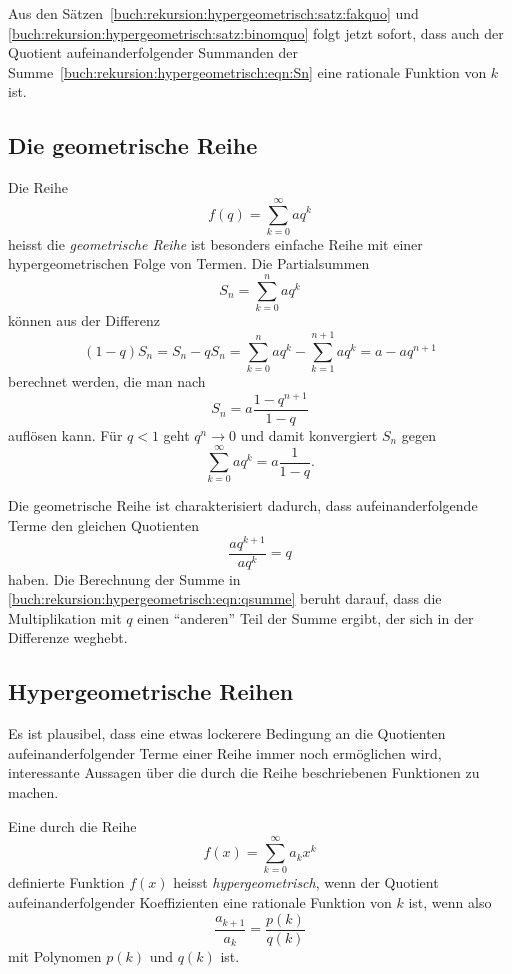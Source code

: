 Aus den Sätzen~\ref{buch:rekursion:hypergeometrisch:satz:fakquo}
und
\ref{buch:rekursion:hypergeometrisch:satz:binomquo}
folgt jetzt sofort, dass auch der Quotient aufeinanderfolgender
Summanden der Summe~\eqref{buch:rekursion:hypergeometrisch:eqn:Sn}
eine rationale Funktion von $k$ ist.

%
%
\subsection{Die geometrische Reihe
\label{buch:rekursion:hypergeometrisch:geometrisch}}
Die Reihe
\[
f(q)
=
\sum_{k=0}^\infty aq^k
\]
heisst die {\em geometrische Reihe} ist besonders einfache
Reihe mit einer hypergeometrischen Folge von Termen.
%
%
Die Partialsummen 
\[
S_n
=
\sum_{k=0}^n aq^k
\]
können aus der Differenz
\begin{equation}
(1-q)S_n
=
S_n - qS_n
=
\sum_{k=0}^n aq^k
-
\sum_{k=1}^{n+1} aq^k
=
a -aq^{n+1}
\label{buch:rekursion:hypergeometrisch:eqn:qsumme}
\end{equation}
berechnet werden, die man nach
\begin{equation}
S_n 
=
a\frac{1-q^{n+1}}{1-q}
\label{buch:rekursion:hypergeometrisch:eqn:geomsumme}
\end{equation}
auflösen kann.
Für $q<1$ geht $q^n\to 0$ und damit konvergiert
$S_n$  gegen
\[
\sum_{k=0}^\infty aq^k
=
a\frac{1}{1-q}.
\]

Die geometrische Reihe ist charakterisiert dadurch, dass aufeinanderfolgende
Terme den gleichen Quotienten
\[
\frac{aq^{k+1}}{aq^k}
=
q
\]
haben.
%
%
Die Berechnung der Summe in 
\eqref{buch:rekursion:hypergeometrisch:eqn:qsumme}
beruht darauf, dass die Multiplikation mit $q$ einen ``anderen''
Teil der Summe ergibt, der sich in der Differenze weghebt.

%
%
\subsection{Hypergeometrische Reihen
\label{buch:rekursion:hypergeometrisch:reihen}}
Es ist plausibel, dass eine etwas lockerere Bedingung an die
Quotienten aufeinanderfolgender Terme einer Reihe immer noch
ermöglichen wird, interessante Aussagen über die durch die
Reihe beschriebenen Funktionen zu machen.

\begin{definition}
\label{buch:rekursion:hypergeometrisch:def:allg}
Eine durch die Reihe
\[
f(x) = \sum_{k=0}^\infty a_k x^k
\]
definierte Funktion $f(x)$ heisst {\em hypergeometrisch},
wenn der Quotient aufeinanderfolgender
Koeffizienten eine rationale Funktion von $k$ ist,
wenn also
\[
\frac{a_{k+1}}{a_k}
=
\frac{p(k)}{q(k)}
\]
mit Polynomen $p(k)$ und $q(k)$ ist.
\end{definition}

